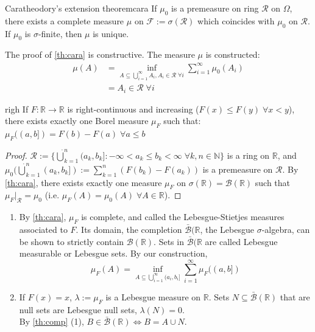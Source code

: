 \documentclass{article}
\begin{document}
	\begin{mythm}{Caratheodory's extension theorem}{cara}
		If $\mu_0$ is a premeasure on ring $\mathcal{R}$ on $\Omega$, there exists a complete measure $\mu$ on $\mathcal{F}:=\sigma(\mathcal{R})$ which coincides with $\mu_0$ on $\mathcal{R}$. If $\mu_0$ is $\sigma$-finite, then $\mu$ is unique.
	\end{mythm}
	
	\begin{myrem}{}{}
		The proof of \ref{th:cara} is constructive. The measure $\mu$ is constructed:
		\begin{align*}
			\mu(A)&=\inf_{A\subseteq\bigcup_{i=1}^{\infty}A_i, A_i\in\mathcal{R}\;\forall i}\sum_{i=1}^{\infty}\mu_0(A_i)\\
			&=A_i\in\mathcal{R}\;\forall i
		\end{align*}
	\end{myrem}
	
	\begin{mythm}{}{righ}
		If $F : \mathbb{R}\to\mathbb{R}$ is right-continuous and increasing ($F(x)\leq F(y)\;\forall x<y$), there exists exactly one Borel measure $\mu_F$ such that:\\
		
		$\mu_F((a, b])=F(b)-F(a)\;\forall a\leq b$
		
		\begin{proof}
			$\mathcal{R}:=\{\dot\bigcup_{k=1}^{n}(a_k, b_k] : -\infty<a_k\leq b_k<\infty\;\forall k, n\in\mathbb{N}\}$ is a ring on $\mathbb{R}$, and $\mu_0(\dot\bigcup_{k=1}^{n}(a_k, b_k]):=\sum_{k=1}^{n}(F(b_k)-F(a_k))$ is a premeasure on $\mathcal{R}$. By \ref{th:cara}, there exists exactly one measure $\mu_F$ on $\sigma(\mathbb{R})=\mathcal{B}(\mathbb{R})$ such that $\mu_F|_{\mathcal{R}}=\mu_0$ (i.e. $\mu_F(A)=\mu_0(A)\;\forall A\in\mathbb{R}$).
		\end{proof}
	\end{mythm}
	
	\begin{myrem}{}{}
		\begin{enumerate}
			\item By \ref{th:cara}, $\mu_F$ is complete, and called the Lebesgue-Stietjes measures associated to $F$. Its domain, the completion $\bar{\mathcal{B}}(\mathbb{R}$, the Lebesgue $\sigma$-algebra, can be shown to strictly contain $\mathcal{B}(\mathbb{R})$. Sets in $\bar{\mathcal{B}}(\mathbb{R}$ are called Lebesgue measurable or Lebesgue sets. By our construction,
			\begin{equation*}
				\mu_F(A)=\inf_{A\subseteq\bigcup_{i=1}^{\infty}(a_i, b_i]}\sum_{i=1}^{\infty}\mu_F((a, b])
			\end{equation*}
			\item If $F(x)=x$, $\lambda:=\mu_F$ is a Lebesgue measure on $\mathbb{R}$. Sets $N\subseteq\bar{\mathcal{B}}(\mathbb{R})$ that are null sets are Lebesgue null sets, $\lambda(N)=0$.\\
			
			By \ref{th:comp} (1), $B\in\bar{\mathcal{B}}(\mathbb{R})\Leftrightarrow B=A\cup N$.
		\end{enumerate}
	\end{myrem}
	
\end{document}
